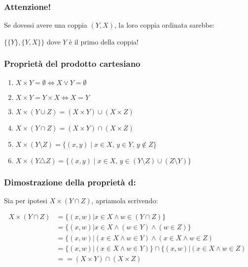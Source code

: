 \documentclass[article,12pt]{book}
\begin{document}
\begin{enumerate}
\subsubsection{Attenzione!}
Se dovessi avere una coppia $(Y,X)$, la loro coppia ordinata sarebbe:
\begin{center}
    $\{\{Y\},\{Y,X\}\} $ dove $Y$ è il primo della coppia!
\end{center}
\newpage

\subsubsection{Proprietà del prodotto cartesiano}
    \begin{enumerate}
        \item $X \times Y = \emptyset \iff X \lor Y = \emptyset$
        \item $X \times Y = Y \times X \iff X = Y$
        \item $X \times (Y \cup Z) = (X \times Y) \cup (X \times Z)$
        \item $X \times (Y \cap Z) = (X \times Y) \cap (X \times Z)$
        \item $X \times (Y \setminus Z) = \{ (x, y) \mid x \in X, \, y \in Y, \, y \notin Z \}$
        \item $X \times (Y \triangle Z) = \{ (x, y) \mid x \in X, \, y \in (Y \setminus Z) \cup (Z \setminus Y) \}$
    \end{enumerate}

\subsubsection{Dimostrazione della proprietà d:}
Sia per ipotesi $X \times (Y \cap Z)$, apriamola scrivendo:
\begin{center}
        \begin{align*}
             X \times (Y \cap Z) &= \{(x,w)|x \in X \land w \in (Y \cap Z)\} \\
                                 &= \{(x,w)|x \in X \land (w \in Y) \land (w \in Z)\} \\
                                 &= \{(x,w)|(x \in X \land w \in Y ) \land (x \in X \land w \in Z) \\
                                 &= \{(x,w)|(x \in X \land w \in Y )\} \cap \{(x,w)|(x \in X \land w \in Z )\ \\
                                 &== (X \times Y) \cap (X \times Z)
        \end{align*}
       





\end{center}
\end{enumerate}
\end{document}
